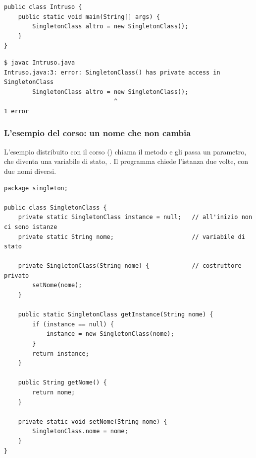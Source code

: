 \begin{lstlisting}[style=java, name=Intruso.java]
public class Intruso {
    public static void main(String[] args) {
        SingletonClass altro = new SingletonClass();
    }
}
\end{lstlisting}
\begin{lstlisting}[style=shell, name=Terminale]
$ javac Intruso.java
Intruso.java:3: error: SingletonClass() has private access in SingletonClass
        SingletonClass altro = new SingletonClass();
                               ^
1 error
\end{lstlisting}

\subsubsection*{L'esempio del corso: un nome che non cambia}

L'esempio distribuito con il corso () chiama il metodo  e gli passa un parametro,
che diventa una variabile di stato, . Il programma chiede l'istanza due volte, con due nomi diversi.

\begin{lstlisting}[style=java, name=SingletonClass.java]
package singleton;

public class SingletonClass {
    private static SingletonClass instance = null;   // all'inizio non ci sono istanze
    private static String nome;                      // variabile di stato

    private SingletonClass(String nome) {            // costruttore privato
        setNome(nome);
    }

    public static SingletonClass getInstance(String nome) {
        if (instance == null) {
            instance = new SingletonClass(nome);
        }
        return instance;
    }

    public String getNome() {
        return nome;
    }

    private static void setNome(String nome) {
        SingletonClass.nome = nome;
    }
}
\end{lstlisting}

